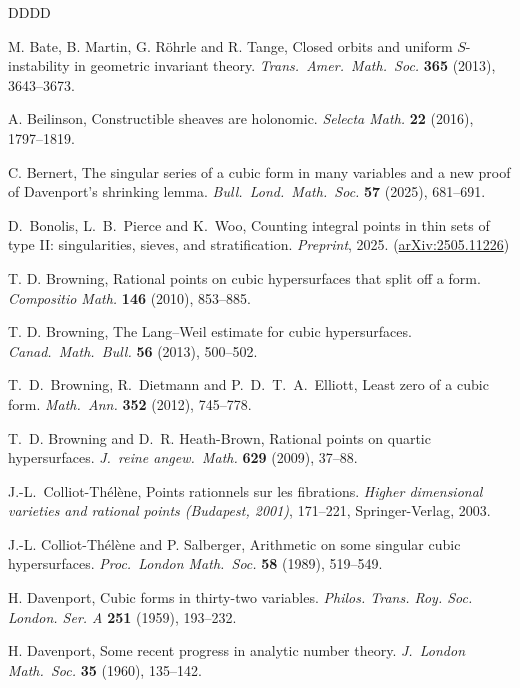 \documentclass[a4paper,11pt, twoside,reqno]{amsart}
\theoremstyle{plain}
\theoremstyle{definition}
\theoremstyle{remark}
\numberwithin{equation}{section}
\begin{document}
\begin{thebibliography}{DDDD}

M. Bate,
B. Martin,
G. R\"ohrle and 
R. Tange,
Closed orbits and uniform $S$-instability in geometric invariant theory. {\em Trans.\ Amer.\ Math.\ Soc.} {\bf 365} (2013), 3643--3673.

A. Beilinson, Constructible sheaves are holonomic.
\emph{Selecta Math.} \textbf{22} (2016), 1797--1819.

C. Bernert, The singular series of a cubic form in many variables and a new proof of Davenport's shrinking lemma. {\em Bull.\ Lond.\ Math.\ Soc.} {\bf 57} (2025), 681--691.


D.~Bonolis, L.~B.~Pierce and K.~Woo,
Counting integral points in thin sets of type II: singularities, sieves, and stratification. {\em Preprint}, 2025.
(\href{https://arxiv.org/abs/2505.11226}{arXiv:2505.11226})


 T. D. Browning,
Rational points on cubic hypersurfaces that split off a form.
{\em Compositio Math.}  {\bf 146} (2010), 853--885.


 T. D. Browning,
The Lang--Weil estimate for cubic hypersurfaces.
{\em Canad.\ Math.\ Bull.} {\bf 56} (2013), 500--502.

T.~D.~Browning, R.~Dietmann and P.~D.~T.~A.~Elliott,
Least zero of a cubic form.
{\em Math.\ Ann.} {\bf 352} (2012), 745--778.


 T.~D. Browning and D.~R. Heath-Brown,
 Rational points on quartic hypersurfaces.
{\em J.\ reine angew.\ Math.} {\bf 629} (2009), 37--88. 

J.-L.~Colliot-Th\'el\`ene, Points rationnels sur les fibrations.  
{\em Higher dimensional varieties and rational points (Budapest, 2001)},
171--221, Springer-Verlag,  2003.


J.-L. Colliot-Th\'el\`ene and P. Salberger,
Arithmetic on some singular cubic hypersurfaces.
{\em Proc.\  London Math.\ Soc.}  {\bf 58} (1989),  519--549.


H. Davenport, 
Cubic forms in thirty-two variables.
{\em Philos. Trans. Roy. Soc. London. Ser. A} {\bf 251} (1959), 193--232. 


H. Davenport,
Some recent progress in analytic number theory.
{\em J.\ London Math.\ Soc.} {\bf 35} (1960), 135--142.


\end{thebibliography}
\end{document}
